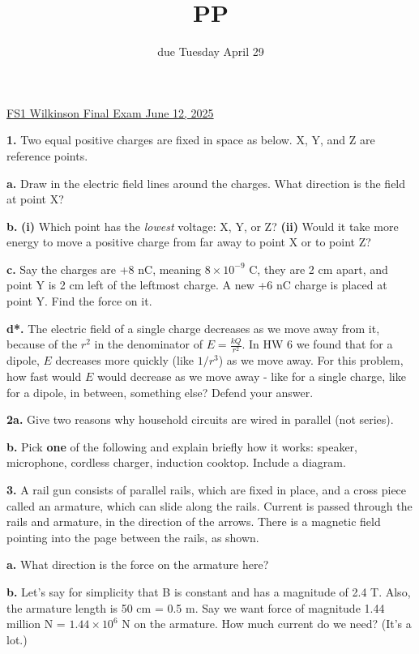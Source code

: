 \documentclass[12pt]{article}
\title{PP}
\date{due Tuesday April 29}
\begin{document}
\setlength{\parindent}{0pt}
\setlength{\parskip}{3mm}

\underline{FS1 Wilkinson Final Exam June 12, 2025}

\textbf{1.} Two equal positive charges are fixed in space as below. X, Y, and Z are reference points.

\vspace{2cm}


\textbf{a.} Draw in the electric field lines around the charges. What direction is the field at point X?

\textbf{b.} \textbf{(i)} Which point has the \textit{lowest} voltage: X, Y, or Z? \textbf{(ii)} Would it take more energy to move a positive charge from far away to point X or to point Z? 

\textbf{c.} Say the charges are +8 nC, meaning $8 \times 10^{-9}$ C, they are 2 cm apart, and point Y is 2 cm left of the leftmost charge. A new +6 nC charge is placed at point Y. Find the force on it.

\textbf{d*.} The electric field of a single charge decreases as we move away from it, because of the $r^2$ in the denominator of $E=\frac{kQ}{r^2}$. In HW 6 we found that for a dipole, $E$ decreases more quickly (like $1/r^3$) as we move away. For this problem, how fast would $E$ would decrease as we move away - like for a single charge, like for a dipole, in between, something else? Defend your answer.

\bigskip

\textbf{2a.} Give two reasons why household circuits are wired in parallel (not series).

\textbf{b.} Pick \textbf{one} of the following and explain briefly how it works: speaker, microphone, cordless charger, induction cooktop. Include a diagram.

\bigskip

\textbf{3.} A rail gun consists of parallel rails, which are fixed in place, and a cross piece called an armature, which can slide along the rails. Current is passed through the rails and armature, in the direction of the arrows. There is a magnetic field pointing into the page between the rails, as shown. 

\vspace{2cm}

\textbf{a.} What direction is the force on the armature here?

\textbf{b.} Let's say for simplicity that B is constant and has a magnitude of 2.4 T. Also, the armature length is 50 cm = 0.5 m. Say we want force of magnitude 1.44 million N = $1.44\times 10^6$ N on the armature. How much current do we need? (It's a lot.)
\end{document}
